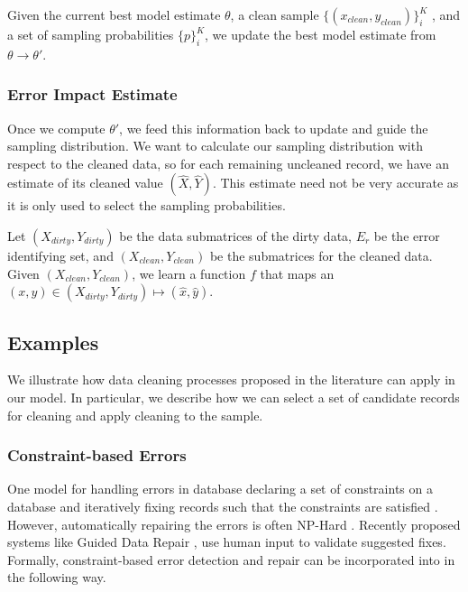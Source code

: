 \begin{problem}\label{imp-update}\sloppy
Given the current best model estimate $\theta$, a clean sample $\{(x_{clean},y_{clean})\}^K_i$ , and a set of sampling probabilities $\{p\}^K_i$, we update the best model estimate from $\theta \rightarrow \theta'$.
\end{problem}

\subsubsection{Error Impact Estimate}
Once we compute $\theta'$, we feed this information back to update and guide the sampling distribution.
We want to calculate our sampling distribution with respect to the cleaned data, so for each remaining uncleaned record, we have an estimate of its cleaned value $(\hat{X},\hat{Y})$.
This estimate need not be very accurate as it is only used to select the sampling probabilities.

\begin{problem}\label{imp-est}\sloppy
Let $(X_{dirty},Y_{dirty})$ be the data submatrices of the dirty data, $E_r$ be the error identifying set, and $(X_{clean},Y_{clean})$ be the submatrices for the cleaned data. Given $(X_{clean},Y_{clean})$, we learn a function $f$ that maps an $(x,y) \in (X_{dirty},Y_{dirty}) \mapsto (\hat{x},\hat{y})$.
\end{problem}
\fi

\subsection{Examples}
We illustrate how data cleaning processes proposed in the literature can apply in our model.
In particular, we describe how we can select a set of candidate records for cleaning and apply cleaning to the sample.

\subsubsection{Constraint-based Errors}
One model for handling errors in database declaring a set of constraints on a database and 
iteratively fixing records such that the constraints are satisfied \cite{DBLP:journals/pvldb/YakoutENOI11, DBLP:journals/pvldb/FanLMTY10, khayyat2015bigdansing}.
However, automatically repairing the errors is often NP-Hard \cite{DBLP:journals/pvldb/FanLMTY10}.
Recently proposed systems like Guided Data Repair \cite{DBLP:journals/pvldb/YakoutENOI11}, use human input to validate suggested fixes.
Formally, constraint-based error detection and repair can be incorporated into \sys in the following way.

